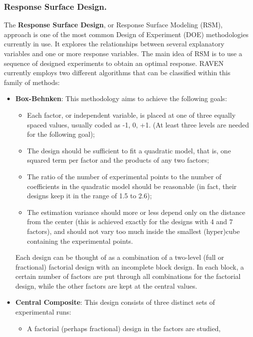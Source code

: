 \subsubsection{Response Surface Design.}
\label{subsubsubsec:RespSurfDOE}
The \textbf{Response Surface Design}, or Response Surface Modeling (RSM), 
approach is one of the most common Design of Experiment (DOE) methodologies
currently in use.
%
It explores the relationships between several explanatory variables and one or
more response variables.
%
The main idea of RSM is to use a sequence of designed experiments to obtain an
optimal response.
%
RAVEN currently employs two different algorithms that can be classified within
this family of methods:
\begin{itemize}
 \item \textbf{Box-Behnken}: This methodology aims to achieve the following
  goals:
  \begin{itemize}
    \item Each factor, or independent variable, is placed at one of three
      equally spaced values, usually coded as -1, 0, +1. (At least three levels
      are needed for the following goal);
    \item The design should be sufficient to fit a quadratic model, that is, one
      squared term per factor and the products of any two factors;
    \item The ratio of the number of experimental points to the number of
      coefficients in the quadratic model should be reasonable (in fact, their
      designs keep it in the range of 1.5 to 2.6);
    \item The estimation variance should more or less depend only on the
      distance from the center (this is achieved exactly for the designs with 4
      and 7 factors), and should not vary too much inside the smallest
      (hyper)cube containing the experimental points.
  \end{itemize}
  Each design can be thought of as a combination of a two-level (full or
  fractional) factorial design with an incomplete block design.
  In each block, a certain number of factors are put through all combinations
  for the factorial design, while the other factors are kept at the central
  values.
 \item \textbf{Central Composite}: This design consists of three distinct sets
  of experimental runs:
  \begin{itemize}
    \item A factorial (perhaps fractional) design in the factors are studied,

\end{itemize}
\end{itemize}
